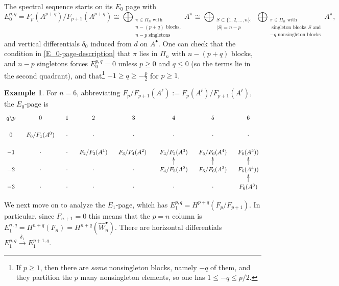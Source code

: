 \documentclass[12pt]{amsart}
\theoremstyle{plain}
\theoremstyle{definition}
\newtheorem{ex}[thm]{Example}
\begin{document}
The spectral sequence starts on its $E_0$ page with
\begin{equation}
\label{E_0-page-description}
E_0^{p,q} 
= F_p(A^{p+q})/F_{p+1}(A^{p+q}) 
\cong \bigoplus_{\substack{\pi \in \Pi_n\text{ with}
                   \\  n-(p+q)\text{ blocks,}
                   \\ n-p\text{ singletons} }} A^\pi
\cong \bigoplus_{\substack{S \subset \{1,2,\ldots,n\}:\\ |S|=n-p}} 
    \bigoplus_{\substack{\pi \in \Pi_n\text{ with} \\ 
                \text{ singleton blocks }S\text{ and} \\
                -q \text{ nonsingleton blocks}}}
                   A^\pi,
\end{equation}
and vertical differentials $\delta_0$ induced from $d$ on $A^\bullet$.  
One can check that the condition in \eqref{E_0-page-description}
that $\pi$ lies in $\Pi_n$ with $n-(p+q)$ blocks,
and $n-p$ singletons forces $E_0^{p,q}=0$ unless 
$p \geq 0$ and $q \leq 0$ (so the terms lie in the second quadrant), and 
that\footnote{If $p \geq 1$, then there are {\it some} nonsingleton blocks, namely $-q$ of them, and they partition the $p$ many nonsingleton elements, so one has $1 \leq -q \leq p/2$.}
$-1 \geq q \geq -\frac{p}{2}$ for $p \geq 1$.

\begin{ex}
For $n=6$, abbreviating
$F_p/F_{p+1}(A^\ell):=F_p(A^\ell)/F_{p+1}(A^\ell)$, the $E_0$-page is
$$
\xymatrix@R=1pc@C=1pc{
q\backslash p &0            &1          &2          &3           &4          &5          &6 \\
0   &F_0/F_1(A^0)           &\cdot          &\cdot          &\cdot           &\cdot          &\cdot          &\cdot\\
-1  &\cdot                      &\cdot           &F_2/F_3(A^1)    &F_3/F_4(A^2)\    &F_4/F_5(A^3)     &F_5/F_6(A^4)      &F_6(A^5)) \\
-2  &\cdot                      &\cdot           &\cdot           &\cdot           &F_4/F_5(A^2)\ar[u]&F_5/F_6(A^3)\ar[u]&F_6(A^4))\ar[u] \\
-3  &\cdot                      &\cdot           &\cdot           &\cdot           &\cdot           &\cdot       &F_6(A^3)\ar[u] \\
}
$$
\end{ex}

We next move on to analyze the $E_1$-page, which has
$E_1^{p,q}=H^{p+q}(F_p/F_{p+1})$.  In particular, since $F_{n+1}=0$
this means that the $p=n$ column is 
$
E_1^{n,q}=H^{n+q}(F_n)=H^{n+q}(\hat{W}^\bullet_n).
$
There are horizontal differentials
$
E_1^{p,q} 
 \overset{\delta_1}{\longrightarrow} 
  E_1^{p+1,q}.
$
\end{document}
